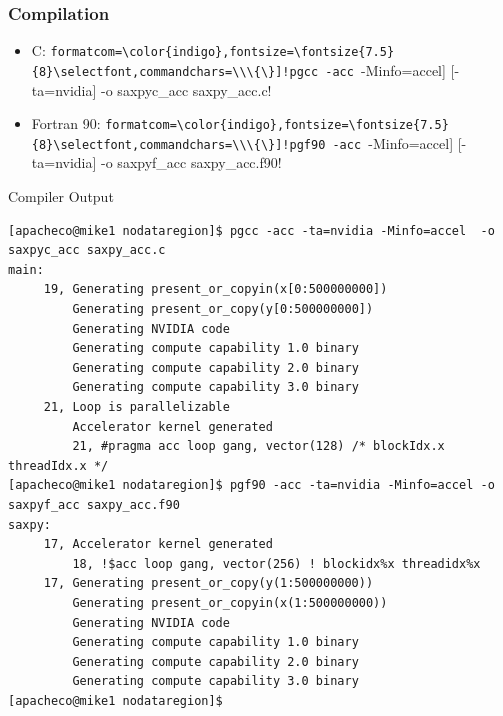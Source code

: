 \documentclass[c,mathserif,compress,xcolor=svgnames]{beamer}
\newcommand{\Verbindigo}[1]{\Verb[formatcom=\color{indigo},fontsize=\fontsize{7.5}{8}\selectfont,commandchars=\\\{\}]!#1!}
\newenvironment{bblock}[0]
{
\begin{beamerboxesrounded}[upper=uppercol1,lower=lowercol1,shadow=true]}
{\end{beamerboxesrounded}}
\begin{document}
\scriptsize
\begin{frame}[fragile]
  \frametitle{\small Compilation}
  \begin{itemize}
    \item C: \Verbindigo{pgcc -acc [-Minfo=accel] [-ta=nvidia] -o saxpyc\_acc saxpy\_acc.c}
    \item Fortran 90:
    \Verbindigo{pgf90 -acc [-Minfo=accel] [-ta=nvidia] -o saxpyf\_acc saxpy\_acc.f90}
  \end{itemize}
  \begin{bblock}{Compiler Output}
    {\fontsize{5}{6}\selectfont
      \begin{Verbatim}
[apacheco@mike1 nodataregion]$ pgcc -acc -ta=nvidia -Minfo=accel  -o saxpyc_acc saxpy_acc.c
main:
     19, Generating present_or_copyin(x[0:500000000])
         Generating present_or_copy(y[0:500000000])
         Generating NVIDIA code
         Generating compute capability 1.0 binary
         Generating compute capability 2.0 binary
         Generating compute capability 3.0 binary
     21, Loop is parallelizable
         Accelerator kernel generated
         21, #pragma acc loop gang, vector(128) /* blockIdx.x threadIdx.x */
[apacheco@mike1 nodataregion]$ pgf90 -acc -ta=nvidia -Minfo=accel -o saxpyf_acc saxpy_acc.f90
saxpy:
     17, Accelerator kernel generated
         18, !$acc loop gang, vector(256) ! blockidx%x threadidx%x
     17, Generating present_or_copy(y(1:500000000))
         Generating present_or_copyin(x(1:500000000))
         Generating NVIDIA code
         Generating compute capability 1.0 binary
         Generating compute capability 2.0 binary
         Generating compute capability 3.0 binary
[apacheco@mike1 nodataregion]$
      \end{Verbatim}
    }
  \end{bblock}
\end{frame}
\end{document}
